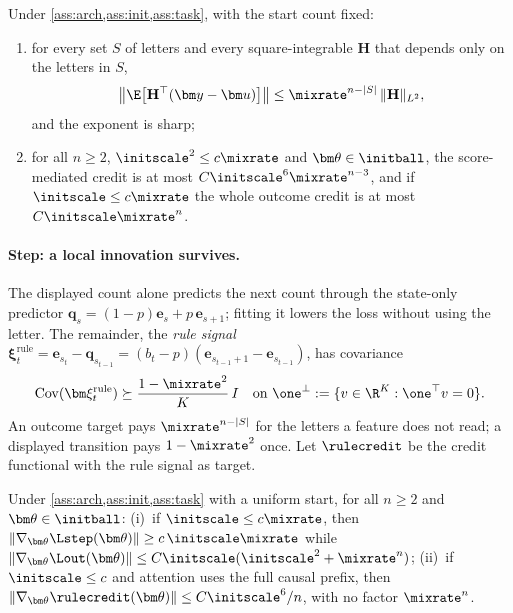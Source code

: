 \begin{lemma}
\label{thm:main}
Under \cref{ass:arch,ass:init,ass:task}, with the start count fixed:
\begin{enumerate}[label=(\roman*),leftmargin=*,itemsep=0pt,topsep=2pt]
\item for every set $S$ of letters and every square-integrable $\mathbf H$ that depends only on the letters in $S$,
\begin{equation}
 \bigl\|\E\bigl[\mathbf H^\top(\bm y-\bm u)\bigr]\bigr\|\le\mixrate^{n-|S|}\,\|\mathbf H\|_{L^2},
 \label{eq:credit-degree}
\end{equation}
and the exponent is sharp;
\item for all $n\ge2$, $\initscale^2\le c\mixrate$ and $\bm\theta\in\initball$, the score-mediated credit is at most $C\initscale^6\mixrate^{n-3}$, and if
$\initscale\le c\mixrate$ the whole outcome credit is at most $C\initscale\mixrate^n$.
\end{enumerate}
\end{lemma}

\paragraph{Step: a local innovation survives.} The displayed count alone predicts the next count through the state-only predictor
$\bm q_s=(1-p)\bm e_s+p\,\bm e_{s+1}$; fitting it lowers the loss without using the letter. The remainder, the \emph{rule signal}
$\bm\xi^{\mathrm{rule}}_t=\bm e_{s_t}-\bm q_{s_{t-1}}=(b_t-p)(\bm e_{s_{t-1}+1}-\bm e_{s_{t-1}})$, has covariance
\begin{equation}
 \operatorname{Cov}(\bm\xi^{\mathrm{rule}}_t)\succeq\frac{1-\mixrate^2}{K}\,I
 \quad\text{on }\one^\perp:=\{v\in\R^K:\one^\top v=0\}.
 \label{eq:local-variation}
\end{equation}
An outcome target pays $\mixrate^{n-|S|}$ for the letters a feature does not read; a displayed transition pays $1-\mixrate^2$ once. Let
$\rulecredit$ be the credit functional with the rule signal as target.

\begin{lemma}
\label{thm:separation}
Under \cref{ass:arch,ass:init,ass:task} with a uniform start, for all $n\ge2$ and $\bm\theta\in\initball$:
(i)~if $\initscale\le c\mixrate$, then $\|\nabla_{\bm\theta}\Lstep(\bm\theta)\|\ge c\,\initscale\mixrate$ while
$\|\nabla_{\bm\theta}\Lout(\bm\theta)\|\le C\initscale(\initscale^2+\mixrate^n)$;
(ii)~if $\initscale\le c$ and attention uses the full causal prefix, then $\|\nabla_{\bm\theta}\rulecredit(\bm\theta)\|\le C\initscale^6/n$, with
no factor $\mixrate^n$.
\end{lemma}

